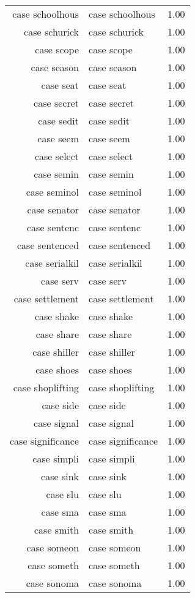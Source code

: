 \begin{table}[ht]
\begin{tabular}{rlr}
  case schoolhous & case schoolhous & 1.00 \\ 
  case schurick & case schurick & 1.00 \\ 
  case scope & case scope & 1.00 \\ 
  case season & case season & 1.00 \\ 
  case seat & case seat & 1.00 \\ 
  case secret & case secret & 1.00 \\ 
  case sedit & case sedit & 1.00 \\ 
  case seem & case seem & 1.00 \\ 
  case select & case select & 1.00 \\ 
  case semin & case semin & 1.00 \\ 
  case seminol & case seminol & 1.00 \\ 
  case senator & case senator & 1.00 \\ 
  case sentenc & case sentenc & 1.00 \\ 
  case sentenced & case sentenced & 1.00 \\ 
  case serialkil & case serialkil & 1.00 \\ 
  case serv & case serv & 1.00 \\ 
  case settlement & case settlement & 1.00 \\ 
  case shake & case shake & 1.00 \\ 
  case share & case share & 1.00 \\ 
  case shiller & case shiller & 1.00 \\ 
  case shoes & case shoes & 1.00 \\ 
  case shoplifting & case shoplifting & 1.00 \\ 
  case side & case side & 1.00 \\ 
  case signal & case signal & 1.00 \\ 
  case significance & case significance & 1.00 \\ 
  case simpli & case simpli & 1.00 \\ 
  case sink & case sink & 1.00 \\ 
  case slu & case slu & 1.00 \\ 
  case sma & case sma & 1.00 \\ 
  case smith & case smith & 1.00 \\ 
  case someon & case someon & 1.00 \\ 
  case someth & case someth & 1.00 \\ 
  case sonoma & case sonoma & 1.00 \\ 

\end{tabular}
\end{table}
